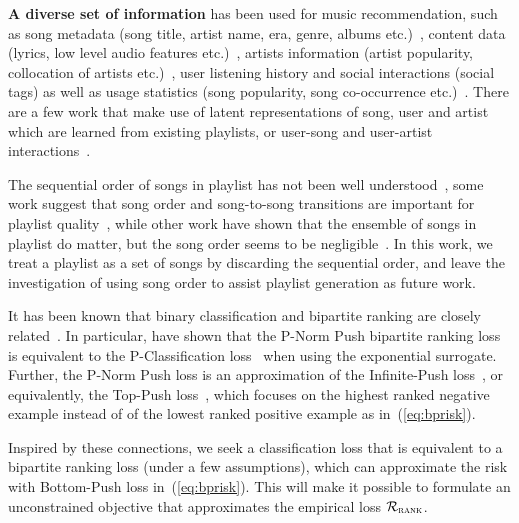 {\bf A diverse set of information} has been used for music recommendation,
such as song metadata (\eg song title, artist name, era, genre, albums etc.)~\cite{hariri2012context,platt2002learning},
content data (\eg lyrics, low level audio features etc.)~\cite{mcfee2011natural,mcfee2012hypergraph,jannach2015beyond,ben2017groove},
artists information (\eg artist popularity, collocation of artists etc.)~\cite{bonnin2013evaluating,ben2017groove},
user listening history and social interactions (\eg social tags) as well as usage statistics (\eg song popularity,
song co-occurrence etc.)~\cite{mcfee2012hypergraph,hariri2012context,bonnin2013evaluating,jannach2015beyond,ben2017groove}.
There are a few work that make use of latent representations of song, user and artist which are learned from existing playlists,
or user-song and user-artist interactions~\cite{chen2012playlist,ben2017groove}.

The sequential order of songs in playlist has not been well understood~\cite{schedl2017},
some work suggest that song order and song-to-song transitions are important
for playlist quality~\cite{mcfee2012hypergraph,kamehkhosh2018automated},
while other work have shown that the ensemble of songs in playlist do matter,
but the song order seems to be negligible~\cite{tintarev2017sequences,vall2017importance}.
In this work, we treat a playlist as a set of songs by discarding the sequential order,
and leave the investigation of using song order to assist playlist generation as future work.




It has been known that binary classification and bipartite ranking are
closely related~\cite{ertekin2011equivalence,menon2016bipartite}.
In particular, \citet{ertekin2011equivalence} have shown that the P-Norm Push bipartite ranking loss~\cite{rudin2009p}
is equivalent to the P-Classification loss~\cite{ertekin2011equivalence} when using the exponential surrogate.
Further, the P-Norm Push loss is an approximation of the Infinite-Push loss~\cite{agarwal2011infinite},
or equivalently, the Top-Push loss~\cite{li2014top}, which focuses on the highest ranked negative example instead of
of the lowest ranked positive example as in~(\ref{eq:bprisk}).

Inspired by these connections, we seek a classification loss that is equivalent to a bipartite ranking loss (under a few assumptions),
which can approximate the risk with Bottom-Push loss in~(\ref{eq:bprisk}).
This will make it possible to formulate an unconstrained objective that approximates the empirical loss $\mathcal{R}_\textsc{rank}$.


